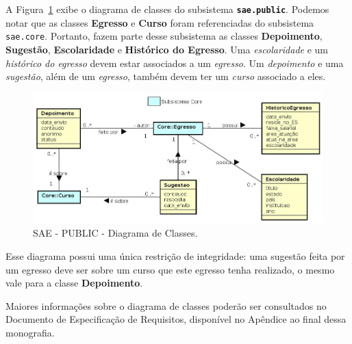A Figura~\ref{fig-requisitos-public-diagrama-classes} exibe o diagrama de classes do subsistema \textbf{\texttt{sae.public}}. Podemos notar que as classes \textbf{Egresso} e \textbf{Curso} foram referenciadas do subsistema \texttt{sae.core}. Portanto, fazem parte desse subsistema as classes \textbf{Depoimento}, \textbf{Sugestão}, \textbf{Escolaridade} e \textbf{Histórico do Egresso}. Uma \emph{escolaridade} e um \emph{histórico do egresso} devem estar associados a um \emph{egresso}. Um \emph{depoimento} e uma \emph{sugestão}, além de um \emph{egresso}, também devem ter um \emph{curso} associado a eles.

\begin{figure}[h]
	\centering
	\includegraphics[width=1\textwidth]{figuras/requisitos/diagrama-classe-public}
	\caption{SAE - PUBLIC - Diagrama de Classes.}
	\label{fig-requisitos-public-diagrama-classes}
\end{figure}


Esse diagrama possui uma única restrição de integridade: uma sugestão feita por um egresso deve ser sobre um curso que este egresso tenha realizado, o mesmo vale para a classe \textbf{Depoimento}.

Maiores informações sobre o diagrama de classes poderão ser consultados no Documento de Especificação de Requisitos, disponível no Apêndice ao final dessa monografia.